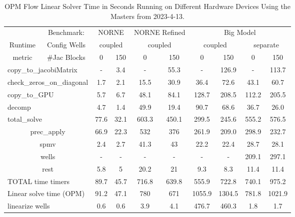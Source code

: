 \begin{table}[!t]
\centering
\begin{tabular}{c|c|c|c|c|c|c|c|c|c}
 & Benchmark: & \multicolumn{2}{|c|}{NORNE} &\multicolumn{2}{|c|}{NORNE Refined} & \multicolumn{4}{|c}{Big Model} \\\cline{2-10}
Runtime & Config Wells & \multicolumn{2}{|c|}{coupled} & \multicolumn{2}{|c|}{coupled} & \multicolumn{2}{|c|}{coupled} & \multicolumn{2}{|c}{separate}\\ \cline{2-10}
metric & \#Jac Blocks & 0 & 150 & 0 & 150 & 0 & 150 & 0 & 150 \\ \hline\hline
\multicolumn{2}{l|}{copy\_to\_jacobiMatrix} & - & 3.4 & - & 55.3 & - & 126.9 & - & 113.7  \\
\multicolumn{2}{l|}{check\_zeros\_on\_diagonal}  & 1.7 & 2.1 & 15.5 & 30.9 & 36.4 & 72.6 & 43.1 & 60.7 \\
\multicolumn{2}{l|}{copy\_to\_GPU}  & 5.7 & 6.7 & 48.1 & 84.1 & 128.7 & 208.5 & 112.2 & 205.5 \\
\multicolumn{2}{l|}{decomp}  & 4.7 & 1.4 & 49.9 & 19.4 & 90.7 & 68.6 & 36.7 & 26.0 \\
\multicolumn{2}{l|}{total\_solve}  & 77.6 & 32.1 & 603.3 & 450.1 & 299.5 & 245.6 & 555.2 & 576.5 \\
\multicolumn{2}{c|}{prec\_apply}  & 66.9 & 22.3 & 532 & 376 & 261.9 & 209.0 & 298.9 & 232.7 \\
\multicolumn{2}{c|}{spmv}  & 2.4 & 2.7 & 41.3 & 43 & 22.2 & 22.4 & 28.7 & 28.1 \\
\multicolumn{2}{c|}{wells}  & - & - & - & - & - & - & 209.1 & 297.1 \\
\multicolumn{2}{c|}{rest}  & 5.8 & 5 & 20.2 & 21 & 9.3 & 8.3 & 11.4& 11.4 \\\hline
\multicolumn{2}{l|}{TOTAL time timers}  & 89.7 & 45.7 & 716.8 & 639.8 & 555.9 & 722.8 & 740.1 & 975.2 \\
\multicolumn{2}{l|}{Linear solve time (OPM)}  & 91.2 & 47.1  & 780 & 671 & 1055.9 & 1304.5 & 781.8 & 1021.9 \\\hline
\multicolumn{2}{l|}{linearize wells}  & 0.6 & 0.6 & 3.9 & 4.1 & 476.7 & 460.3 & 1.8 & 1.7 \\
\end{tabular}
\caption{ OPM Flow Linear Solver Time in Seconds Running on Different Hardware Devices Using the Masters from 2023-4-13.}
\label{tab:runtime_profiles}
\end{table}

